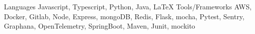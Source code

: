 \begin{cvskills}
  \cvskill
  {Languages}
  {Javascript, Typescript, Python, Java, \LaTeX}
  \cvskill
  {Tools/Frameworks}
  {AWS, Docker, Gitlab, Node, Express, mongoDB, Redis, Flask, mocha, Pytest, Sentry, Graphana, OpenTelemetry, SpringBoot, Maven, Junit, mockito}
\end{cvskills}  